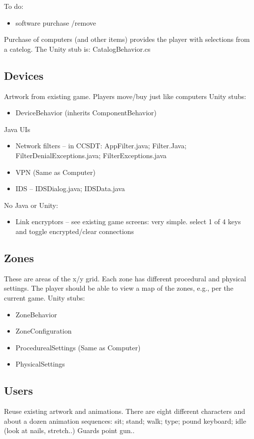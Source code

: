 \documentclass{article}
\begin{document}
\noindent To do:
\begin{itemize}
\item software purchase /remove
\end{itemize}

Purchase of computers (and other items) provides the player with selections from a catelog.  The Unity 
stub is: CatalogBehavior.cs

\subsection{Devices}
Artwork from existing game.
Players move/buy just like computers
\noindent Unity stubs:
\begin{itemize}
\item DeviceBehavior (inherits ComponentBehavior)
\end{itemize}
\noindent Java UIs
\begin{itemize}
\item Network filters  -- in CCSDT: AppFilter.java; Filter.Java; FilterDenialExceptions.java; FilterExceptions.java
\item VPN (Same as Computer)
\item IDS  -- IDSDialog.java; IDSData.java
\end{itemize}
\noindent No Java or Unity:
\begin{itemize}
\item Link encryptors -- see existing game screens: very simple.  select 1 of 4 keys and toggle encrypted/clear connections
\end{itemize}

\subsection{Zones}
These are areas of the x/y grid.  Each zone has different procedural and physical settings.
The player should be able to view a map of the zones, e.g., per the current game.
\noindent Unity stubs:
\begin{itemize}
\item ZoneBehavior
\item ZoneConfiguration
\item ProcedurealSettings (Same as Computer)
\item PhysicalSettings
\end{itemize}

\subsection{Users}
Reuse existing artwork and animations.
There are eight different characters and about a dozen animation sequences:
sit; stand; walk; type; pound keyboard; idle (look at nails,
stretch..)  Guards point gun..
\end{document}

